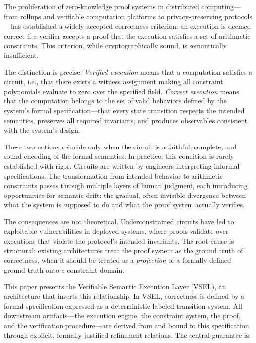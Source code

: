 \documentclass[11pt,a4paper]{article}
\theoremstyle{definition}
\begin{document}
\vspace{10pt}
\tableofcontents
\newpage

The proliferation of zero-knowledge proof systems in distributed computing---from rollups and verifiable computation platforms to privacy-preserving protocols---has established a widely accepted correctness criterion: an execution is deemed correct if a verifier accepts a proof that the execution satisfies a set of arithmetic constraints. This criterion, while cryptographically sound, is semantically insufficient.

The distinction is precise. \emph{Verified execution} means that a computation satisfies a circuit, i.e., that there exists a witness assignment making all constraint polynomials evaluate to zero over the specified field. \emph{Correct execution} means that the computation belongs to the set of valid behaviors defined by the system's formal specification---that every state transition respects the intended semantics, preserves all required invariants, and produces observables consistent with the system's design.

These two notions coincide only when the circuit is a faithful, complete, and sound encoding of the formal semantics. In practice, this condition is rarely established with rigor. Circuits are written by engineers interpreting informal specifications. The transformation from intended behavior to arithmetic constraints passes through multiple layers of human judgment, each introducing opportunities for semantic drift: the gradual, often invisible divergence between what the system is supposed to do and what the proof system actually verifies.

The consequences are not theoretical. Underconstrained circuits have led to exploitable vulnerabilities in deployed systems, where proofs validate over executions that violate the protocol's intended invariants. The root cause is structural: existing architectures treat the proof system as the ground truth of correctness, when it should be treated as a \emph{projection} of a formally defined ground truth onto a constraint domain.

This paper presents the Verifiable Semantic Execution Layer (VSEL), an architecture that inverts this relationship. In VSEL, correctness is defined by a formal specification expressed as a deterministic labeled transition system. All downstream artifacts---the execution engine, the constraint system, the proof, and the verification procedure---are derived from and bound to this specification through explicit, formally justified refinement relations. The central guarantee is:
\end{document}
